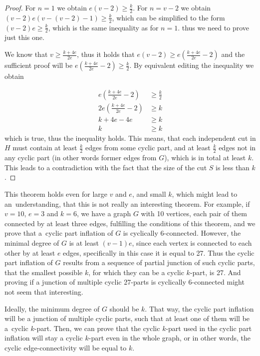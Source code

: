 \documentclass[12pt, twoside]{book}
\begin{document}
\begin{proof}
	For $n=1$ we obtain $e(v-2)\geq \frac{k}{2}$. For $n=v-2$ we obtain $(v-2)e(v-(v-2)-1)\geq\frac{k}{2}$, which can be simplified to the form $(v-2)e\geq\frac{k}{2}$, which is the same inequality as for $n=1$. thus we need to prove just this one.
	
	We know that $v\geq \frac{k+4e}{2e}$, thus it holds that $e(v-2)\geq e(\frac{k+4e}{2e}-2)$ and the sufficient proof will be $e(\frac{k+4e}{2e}-2)\geq \frac{k}{2}$. By equivalent editing the inequality we obtain
	
	\begin{align*}
		e\left(\frac{k+4e}{2e}-2\right)&\geq \frac{k}{2} \\
		2e\left(\frac{k+4e}{2e}-2\right)&\geq k \\
		k+4e-4e&\geq k \\
		k&\geq k
	\end{align*}
	which is true, thus the inequality holds. This means, that each independent cut in $H$ must contain at least $\frac{k}{2}$ edges from some cyclic part, and at least $\frac{k}{2}$ edges not in any cyclic part (in other words former edges from $G$), which is in total at least $k$. This leads to a contradiction with the fact that the size of the cut $S$ is less than $k$.
\end{proof}

This theorem holds even for large $v$ and $e$, and small $k$, which might lead to an~understanding, that this is not really an interesting theorem. For example, if $v=10$, $e=3$ and $k=6$, we have a graph $G$ with 10 vertices, each pair of them connected by at least three edges, fulfilling the conditions of this theorem, and we prove that a~cyclic part inflation of $G$ is cyclically 6-connected. However, the minimal degree of $G$ is at least $(v-1)e$, since each vertex is connected to each other by at least $e$ edges, specifically in this case it is equal to 27. Thus the cyclic part inflation of $G$ results from a sequence of partial junction of such cyclic parts, that the smallest possible $k$, for which they can be a cyclic $k$-part, is 27. And proving if a junction of multiple cyclic 27-parts is cyclically 6-connected might not seem that interesting.

Ideally, the minimum degree of $G$ should be $k$. That way, the cyclic part inflation will be a junction of multiple cyclic parts, such that at least one of them will be a~cyclic $k$-part. Then, we can prove that the cyclic $k$-part used in the cyclic part inflation will stay a cyclic $k$-part even in the whole graph, or in other words, the cyclic edge-connectivity will be equal to $k$.
\end{document}
